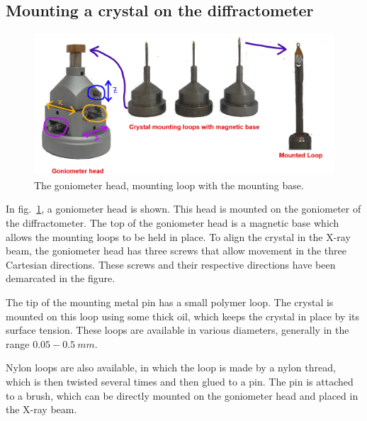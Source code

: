 \subsection{Mounting a crystal on the diffractometer}

	\begin{figure}[t]
		\includegraphics[scale=0.5]{goniometer1.png}
		\caption{\label{fig:goniometer}The goniometer head, mounting loop with the mounting base.}
	\end{figure}

	In fig.~\ref{fig:goniometer}, a goniometer head is shown. This head is mounted on the goniometer of the diffractometer. The top of the goniometer head is a magnetic base which allows the mounting loops to be held in place. To align the crystal in the X-ray beam, the goniometer head has three screws that allow movement in the three Cartesian directions. These screws and their respective directions have been demarcated in the figure.

		The tip of the mounting metal pin has a small polymer loop. The crystal is mounted on this loop using some thick oil, which keeps the crystal in place by its surface tension. These loops are available in various diameters, generally in the range $0.05-0.5~\si{mm}.$

		Nylon loops are also available, in which the loop is made by a nylon thread, which is then twisted several times and then glued to a pin. The pin is attached to a brush, which can be directly mounted on the goniometer head and placed in the X-ray beam.